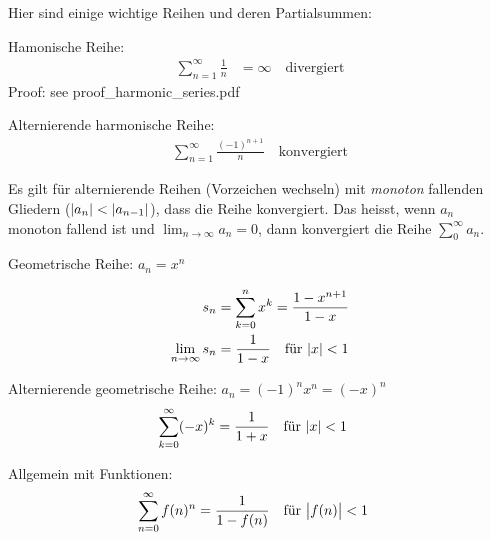 \documentclass[12pt]{article}
\newenvironment{remark}[2][Bemerkung]{\begin{trivlist}
        \item[\hskip \labelsep {\bfseries #1}\hskip \labelsep {\bfseries #2.}]}{\end{trivlist}}
\begin{document}
\begin{remark}{[Wichtige Reihen]} Hier sind einige wichtige Reihen und deren Partialsummen:
    \begin{enumerate}
        \item Hamonische Reihe:
              \begin{align*}
                  \sum_{n=1}^{\infty}\frac{1}{n} & =\infty \quad \text{divergiert}
              \end{align*}
              Proof: see proof\_harmonic\_series.pdf
        \item Alternierende harmonische Reihe:
              \begin{align*}
                  \sum_{n=1}^{\infty}\frac{(-1)^{n+1}}{n} \quad\text{konvergiert}
              \end{align*}
              \begin{remark}{[Leibniz-Kriterium]}
                  Es gilt für alternierende Reihen (Vorzeichen wechseln) mit \textit{monoton} fallenden Gliedern ($\abs{a_n}<\abs{a_{n-1}}$), dass die Reihe konvergiert. Das heisst, wenn $a_n$ monoton fallend ist und $\lim_{n\to\infty}a_n=0$, dann konvergiert die Reihe $\sum_{0}^{\infty}a_n$.
              \end{remark}
        \item Geometrische Reihe: $a_n=x^n$
              \begin{spreadlines}{0.8em}
                  \begin{align*}
                      s_n                  & = \sum_{k=0}^{n}x^k =\frac{1-x^{n
                      +1}}{1-x}                                                         \\
                      \lim_{n\to\infty}s_n & = \frac{1}{1-x}\quad \text{für } \abs{x}<1
                  \end{align*}
              \end{spreadlines}
        \item Alternierende geometrische Reihe: $a_n=(-1)^n x^n = (-x)^n$
              \begin{align*}
                  \sum_{k=0}^{\infty}(-x)^k & = \frac{1}{1+x} \quad \text{für } \abs{x}<1
              \end{align*}
        \item Allgemein mit Funktionen:
              \begin{align*}
                  \sum_{n=0}^{\infty}f(n)^n & =\frac{1}{1-f(n)} \quad \text{für } \abs{f(n)}<1
              \end{align*}
    \end{enumerate}
\end{remark}
\end{document}
